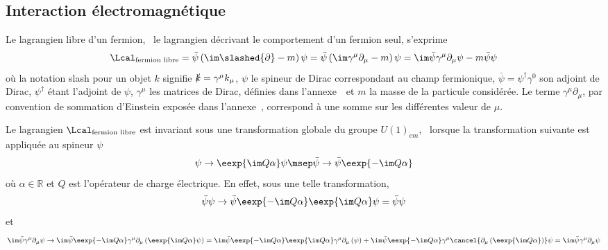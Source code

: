 \subsection{Interaction électromagnétique}\label{chapter-MS-MSSM-section-formalisme-subsec-QED}
Le lagrangien libre d'un fermion, \ie\ le lagrangien décrivant le comportement d'un fermion seul, s'exprime
\begin{equation}
\Lcal_{\text{fermion libre}}
= \bar{\psi} \left( \im\slashed{\partial} - m \right) \psi
= \bar{\psi} \left( \im \gamma^\mu\partial_\mu - m \right) \psi
= \im \bar{\psi} \gamma^\mu\partial_\mu \psi - m \bar{\psi}\psi
\label{eq-lagrangien_fermion_libre_partial}
\end{equation}
où la notation \og slash \fg{} pour un objet $k$ signifie $\slashed{k} = \gamma^\mu k_\mu$, $\psi$ le spineur de Dirac correspondant au champ fermionique, $\bar{\psi}=\psi^\dagger\gamma^0$ son adjoint de Dirac, $\psi^\dagger$ étant l'adjoint de $\psi$, $\gamma^\mu$ les matrices de Dirac, définies dans l'annexe~\ et $m$ la masse de la particule considérée.
Le terme $\gamma^\mu \partial_\mu$, par convention de sommation d'Einstein exposée dans l'annexe~, correspond à une somme sur les différentes valeur de $\mu$.
\par Le lagrangien $\Lcal_{\text{fermion libre}}$ est invariant sous une transformation globale du groupe $U(1)_{em}$, \ie\ lorsque la transformation suivante est appliquée au spineur $\psi$
\begin{equation}
\psi \to \eexp{\im Q\alpha}\psi
\msep
\bar{\psi} \to \bar{\psi}\eexp{-\im Q\alpha}
\end{equation}
où $\alpha\in\mathbb{R}$ et $Q$ est l'opérateur de charge électrique.
En effet, sous une telle transformation,
\begin{equation}
\bar{\psi}\psi \to \bar{\psi}\eexp{-\im Q\alpha}\eexp{\im Q\alpha}\psi = \bar{\psi}\psi
\label{eq-chapter-MS-MSSM-section-formalisme-subsec-QED-tr_jauge-spineur}
\end{equation}
et
\begin{equation}
\im\bar{\psi} \gamma^\mu\partial_\mu \psi
\to
\im\bar{\psi}\eexp{-\im Q\alpha}
\gamma^\mu\partial_\mu
\left(\eexp{\im Q\alpha}\psi\right)
=
\im\bar{\psi}\eexp{-\im Q\alpha}
\eexp{\im Q\alpha}
\gamma^\mu\partial_\mu
\left(\psi\vphantom{\psi\eexp{\im Q\alpha}}\right)
+
\im\bar{\psi}\eexp{-\im Q\alpha}
\gamma^\mu
\cancel{\partial_\mu \left(\eexp{\im Q\alpha}\vphantom{\psi\eexp{\im Q\alpha}}\right)}\psi
= \im\bar{\psi} \gamma^\mu\partial_\mu \psi
\end{equation}
